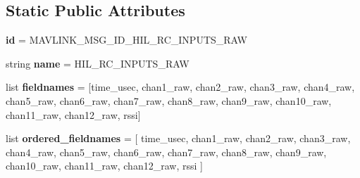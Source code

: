 \subsection*{Static Public Attributes}
\begin{DoxyCompactItemize}
\item 
\mbox{\label{classpymavlink_1_1dialects_1_1v10_1_1MAVLink__hil__rc__inputs__raw__message_afebe66fab4b640bf8756aab355f51d0d}} 
{\bfseries id} = M\+A\+V\+L\+I\+N\+K\+\_\+\+M\+S\+G\+\_\+\+I\+D\+\_\+\+H\+I\+L\+\_\+\+R\+C\+\_\+\+I\+N\+P\+U\+T\+S\+\_\+\+R\+AW
\item 
\mbox{\label{classpymavlink_1_1dialects_1_1v10_1_1MAVLink__hil__rc__inputs__raw__message_ac15ffcf332e2e885ffb9cb4535a99845}} 
string {\bfseries name} = \textquotesingle{}H\+I\+L\+\_\+\+R\+C\+\_\+\+I\+N\+P\+U\+T\+S\+\_\+\+R\+AW\textquotesingle{}
\item 
\mbox{\label{classpymavlink_1_1dialects_1_1v10_1_1MAVLink__hil__rc__inputs__raw__message_a9166f2a312a7ac0365890f72db7806f9}} 
list {\bfseries fieldnames} = \mbox{[}\textquotesingle{}time\+\_\+usec\textquotesingle{}, \textquotesingle{}chan1\+\_\+raw\textquotesingle{}, \textquotesingle{}chan2\+\_\+raw\textquotesingle{}, \textquotesingle{}chan3\+\_\+raw\textquotesingle{}, \textquotesingle{}chan4\+\_\+raw\textquotesingle{}, \textquotesingle{}chan5\+\_\+raw\textquotesingle{}, \textquotesingle{}chan6\+\_\+raw\textquotesingle{}, \textquotesingle{}chan7\+\_\+raw\textquotesingle{}, \textquotesingle{}chan8\+\_\+raw\textquotesingle{}, \textquotesingle{}chan9\+\_\+raw\textquotesingle{}, \textquotesingle{}chan10\+\_\+raw\textquotesingle{}, \textquotesingle{}chan11\+\_\+raw\textquotesingle{}, \textquotesingle{}chan12\+\_\+raw\textquotesingle{}, \textquotesingle{}rssi\textquotesingle{}\mbox{]}
\item 
\mbox{\label{classpymavlink_1_1dialects_1_1v10_1_1MAVLink__hil__rc__inputs__raw__message_a7923d7180b9df3ee5463f1ef92ee9445}} 
list {\bfseries ordered\+\_\+fieldnames} = \mbox{[} \textquotesingle{}time\+\_\+usec\textquotesingle{}, \textquotesingle{}chan1\+\_\+raw\textquotesingle{}, \textquotesingle{}chan2\+\_\+raw\textquotesingle{}, \textquotesingle{}chan3\+\_\+raw\textquotesingle{}, \textquotesingle{}chan4\+\_\+raw\textquotesingle{}, \textquotesingle{}chan5\+\_\+raw\textquotesingle{}, \textquotesingle{}chan6\+\_\+raw\textquotesingle{}, \textquotesingle{}chan7\+\_\+raw\textquotesingle{}, \textquotesingle{}chan8\+\_\+raw\textquotesingle{}, \textquotesingle{}chan9\+\_\+raw\textquotesingle{}, \textquotesingle{}chan10\+\_\+raw\textquotesingle{}, \textquotesingle{}chan11\+\_\+raw\textquotesingle{}, \textquotesingle{}chan12\+\_\+raw\textquotesingle{}, \textquotesingle{}rssi\textquotesingle{} \mbox{]}

\end{DoxyCompactItemize}
